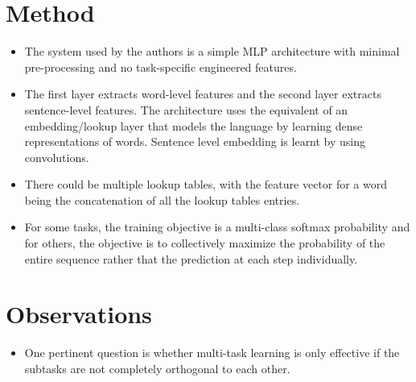 \documentclass[12pt]{scrartcl}
\begin{document}
\section{Method}
  \begin{itemize}
    \item The system used by the authors is a simple MLP architecture with minimal pre-processing and no task-specific engineered features.
    \item The first layer extracts word-level features and the second layer extracts sentence-level features. The architecture uses the equivalent of an embedding/lookup layer that models the language by learning dense representations of words. Sentence level embedding is learnt by using convolutions.
    \item There could be multiple lookup tables, with the feature vector for a word being the concatenation of all the lookup tables entries.
    \item For some tasks, the training objective is a multi-class softmax probability and for others, the objective is to collectively maximize the probability of the entire sequence rather that the prediction at each step individually.
  \end{itemize}

\section{Observations}
  \begin{itemize}
    \item One pertinent question is whether multi-task learning is only effective if the subtasks are not completely orthogonal to each other.
  \end{itemize}



\end{document}

